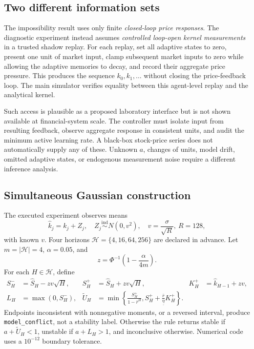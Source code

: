 \documentclass[11pt]{article}
\theoremstyle{remark}\newtheorem{remark}[theorem]{Remark}
\newcommand{\floorate}{\underline\eta}
\begin{document}
\subsection{Two different information sets}
The impossibility result uses only finite \emph{closed-loop price responses}. The diagnostic experiment instead assumes \emph{controlled loop-open kernel measurements} in a trusted shadow replay. For each replay, set all adaptive states to zero, present one unit of market input, clamp subsequent market inputs to zero while allowing the adaptive memories to decay, and record their aggregate price pressure. This produces the sequence $k_0,k_1,\ldots$ without closing the price-feedback loop. The main simulator verifies equality between this agent-level replay and the analytical kernel.

Such access is plausible as a proposed laboratory interface but is not shown available at financial-system scale. The controller must isolate input from resulting feedback, observe aggregate response in consistent units, and audit the minimum active learning rate. A black-box stock-price series does not automatically supply any of these. Unknown $a$, changes of units, model drift, omitted adaptive states, or endogenous measurement noise require a different inference analysis.

\subsection{Simultaneous Gaussian construction}
The executed experiment observes means
\begin{equation}
 \widehat k_j=k_j+Z_j,\quad Z_j\stackrel{\mathrm{ind}}\sim N(0,v^2),\quad
 v=\frac{\sigma}{\sqrt{R}},\ R=128,
\end{equation}
with known $v$. Four horizons $\mathcal H=\{4,16,64,256\}$ are declared in advance. Let $m=|\mathcal H|=4$, $\alpha=0.05$, and
\begin{equation}
 z=\Phi^{-1}\!\left(1-\frac{\alpha}{4m}\right).
\end{equation}
For each $H\in\mathcal H$, define
\begin{align}
 S_H^-&=\widehat S_H-zv\sqrt H,&
 S_H^+&=\widehat S_H+zv\sqrt H,&
 K_H^+&=\widehat k_{H-1}+zv,\\
 L_H&=\max(0,S_H^-),&
 \widetilde U_H&=\min\left\{\frac{S_H^+}{1-\bar r^H},
 S_H^++\frac{\bar r}{\floorate}K_H^+\right\}.\label{eq:ci}
\end{align}
Endpoints inconsistent with nonnegative moments, or a reversed interval, produce \texttt{model\_conflict}, not a stability label. Otherwise the rule returns stable if $a+\widetilde U_H<1$, unstable if $a+L_H>1$, and inconclusive otherwise. Numerical code uses a $10^{-12}$ boundary tolerance.
\end{document}
